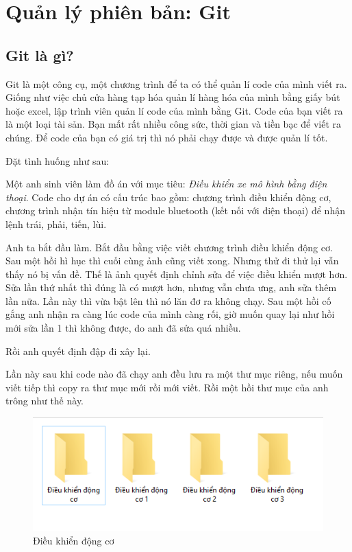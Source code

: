 \chapter{Quản lý phiên bản: Git}
\newpage

\section{Git là gì?}

Git là một công cụ, một chương trình để ta có thể quản lí code của mình viết ra. Giống như việc chủ cửa hàng tạp hóa quản lí hàng hóa của mình bằng giấy bút hoặc excel, lập trình viên quản lí code của mình bằng Git. Code của bạn viết ra là một loại tài sản. Bạn mất rất nhiều công sức, thời gian và tiền bạc để viết ra chúng. Để code của bạn có giá trị thì nó phải chạy được và được quản lí tốt.

Đặt tình huống như sau:

Một anh sinh viên làm đồ án với mục tiêu: \textit{Điều khiển xe mô hình bằng điện thoại}. Code cho dự án có cấu trúc bao gồm: chương trình điều khiển động cơ, chương trình nhận tín hiệu từ module bluetooth (kết nối với điện thoại) để nhận lệnh trái, phải, tiến, lùi.

Anh ta bắt đầu làm. Bắt đầu bằng việc viết chương trình điều khiển động cơ. Sau một hồi hì hục thì cuối cùng ảnh cũng viết xong. Nhưng thử đi thử lại vẫn thấy nó bị vấn đề. Thế là ảnh quyết định chỉnh sửa để việc điều khiển mượt hơn. Sửa lần thứ nhất thì đúng là có mượt hơn, nhưng vẫn chưa ưng, anh sửa thêm lần nữa. Lần này thì vừa bật lên thì nó lăn đơ ra không chạy. Sau một hồi cố gắng anh nhận ra càng lúc code của mình càng rối, giờ muốn quay lại như hồi mới sửa lần 1 thì không được, do anh đã sửa quá nhiều.

Rồi anh quyết định đập đi xây lại.

Lần này sau khi code nào đã chạy anh đều lưu ra một thư mục riêng, nếu muốn viết tiếp thì copy ra thư mục mới rồi mới viết. Rồi một hồi thư mục của anh trông như thế này.

\begin{figure}[h!]
    \centering
    \includegraphics[width=1\linewidth]{images/Dieu_khien_dong_co.PNG}
    \caption{Điều khiển động cơ}
\end{figure}
    
